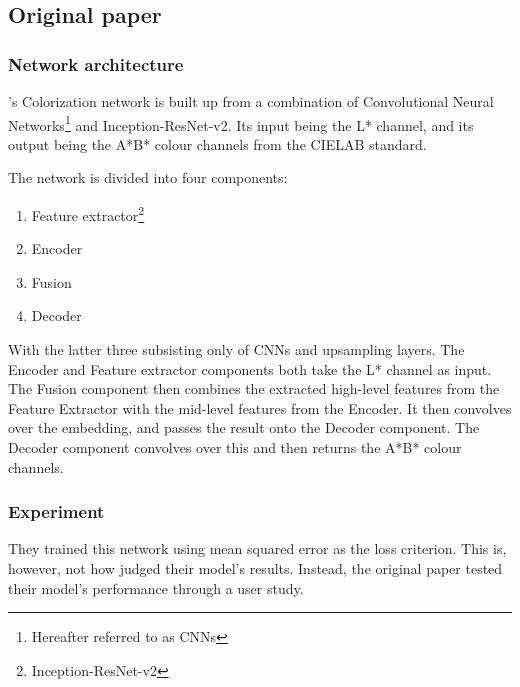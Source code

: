 \documentclass{article}
\begin{document}
    \subsection{Original paper}
    \subsubsection{Network architecture}
        \cite{deepkoal2017}'s Colorization network is built up from a combination of Convolutional Neural Networks\footnote{Hereafter referred to as CNNs} and Inception-ResNet-v2. Its input being the L* channel, and its output being the A*B* colour channels from the CIELAB standard.
        
        The network is divided into four components:
        \begin{enumerate}
            \item Feature extractor\footnote{Inception-ResNet-v2}
            \item Encoder
            \item Fusion
            \item Decoder
        \end{enumerate}
        With the latter three subsisting only of CNNs and upsampling layers. The Encoder and Feature extractor components both take the L* channel as input. The Fusion component then combines the extracted high-level features from the Feature Extractor with the mid-level features from the Encoder. It then convolves over the embedding, and passes the result onto the Decoder component. The Decoder component convolves over this and then returns the A*B* colour channels.
        
    \subsubsection{Experiment}
        They trained this network using mean squared error as the loss criterion. This is, however, not how \cite{deepkoal2017} judged their model's results. Instead, the original paper tested their model's performance through a user study.
        
\end{document}
